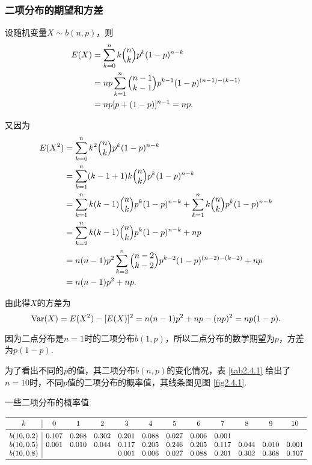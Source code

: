 \subsubsection{二项分布的期望和方差}
设随机变量$X\sim b(n,p)$，则
\begin{align*}
  E(X) & = \sum_{k=0}^nk\Binom nkp^k(1-p)^{n-k} \\
       & = np\sum_{k=1}^n\Binom{n-1}{k-1} p^{k-1}(1-p)^{(n-1)-(k-1)} \\
       & = np[p+(1-p)]^{n-1} = np.
\end{align*}

又因为
\begin{align*}
  E(X^2) & = \sum_{k=0}^nk^2\Binom nkp^k(1-p)^{n-k} \\
  & = \sum_{k=1}^n(k-1+1)k\Binom nkp^k(1-p)^{n-k} \\
  & = \sum_{k=1}^nk(k-1)\Binom nkp^k(1-p)^{n-k} +
    \sum_{k=1}^nk\Binom nkp^k(1-p)^{n-k} \\
  & = \sum_{k=2}^nk(k-1)\Binom nkp^k(1-p)^{n-k} + np \\
  & = n(n-1)p^2\sum_{k=2}^n\Binom{n-2}{k-2} p^{k-2} (1-p)^{(n-2)-(k-2)} + np \\
  & = n(n-1)p^2 + np.
\end{align*}

由此得$X$的方差为
\[
  \operatorname{Var}(X) = E(X^2) - [E(X)]^2 = n(n-1)p^2 + np - (np)^2 = np(1-p).
\]

因为二点分布是$n=1$时的二项分布$b(1,p)$，所以二点分布的数学期望为$p$，方差为$p(1-p)$.

为了看出不同的$p$的值，其二项分布$b(n,p)$的变化情况，表 \ref{tab2.4.1} 给出了$n=10$时，不同$p$值的二项分布的概率值，其线条图见图 \ref{fig2.4.1}.

\begin{table}[!ht]
  \caption{一些二项分布的概率值\label{tab2.4.1}}
  \[
    \begin{array}{c|*{11}{c}}
      \toprule
        k & 0 & 1 & 2 & 3 & 4 & 5 & 6 & 7 & 8 & 9 & 10 \\
      \midrule
        b(10,0.2) & 0.107 & 0.268 & 0.302 & 0.201 & 0.088 & 0.027 & 0.006 & 0.001 & & & \\
        b(10,0.5) & 0.001 & 0.010 & 0.044 & 0.117 & 0.205 & 0.246 & 0.205 & 0.117 & 0.044 & 0.010 & 0.001 \\
        b(10,0.8) & & & & 0.001 & 0.006 & 0.027 & 0.088 & 0.201 & 0.302 & 0.368 & 0.107 \\
      \bottomrule
    \end{array}
  \]
\end{table}

